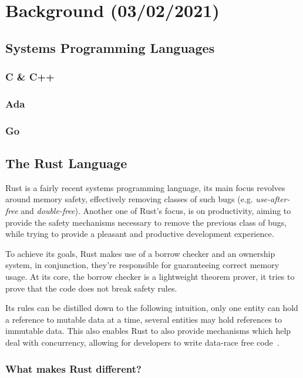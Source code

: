 \chapter{Background (03/02/2021)}\label{cha:related-work}

\section{Systems Programming Languages}

\subsection{C \& C++}

\subsection{Ada}

\subsection{Go}

\section{The Rust Language}\label{sec:rust-lang}

Rust is a fairly recent systems programming language,
its main focus revolves around memory safety,
effectively removing classes of such bugs (e.g. \emph{use-after-free} and \emph{double-free}).
Another one of Rust's focus, is on productivity,
aiming to provide the safety mechanisms necessary to remove the previous class of bugs,
while trying to provide a pleasant and productive development experience.

To achieve its goals, Rust makes use of a borrow checker and an ownership system,
in conjunction, they're responsible for guaranteeing correct memory usage.
At its core, the borrow checker is a lightweight theorem prover,
it tries to prove that the code does not break safety rules.

Its rules can be distilled down to the following intuition,
only one entity can hold a reference to mutable data at a time,
several entities may hold references to immutable data.
This also enables Rust to also provide mechanisms which help deal with concurrency,
allowing for developers to write data-race free
code~\autocite{Turon2015}.

\subsection{What makes Rust different?}

